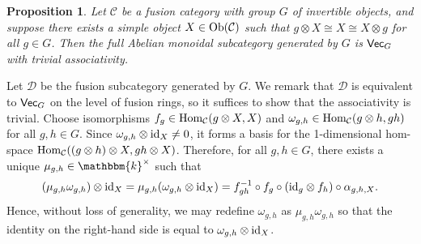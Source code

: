 \documentclass[12pt, reqno]{amsart}
\numberwithin{equation}{section}
\theoremstyle{plainspace}
\newtheorem{proposition}[theorem]{Proposition}
\theoremstyle{definitionspace}
\theoremstyle{remarkspace}
\renewenvironment{proof}{{\noindent\textbf{Proof.}}}{\null\hfill\qedsymbol}
\newcommand{\id}{\textup{id}}
\newcommand{\mathcat}[1]{\mathcal{#1}}
\newcommand{\Ob}{\textup{Ob}}
\newcommand{\Hom}[2][]{
	\ifthenelse{\equal{#2}{}}
		{\textup{Hom}_{#1}}
		{\textup{Hom}_{#1}\!\left(#2\right)}
}
\newcommand{\textcat}[1]{\textup{\textsf{#1}}}
\begin{document}
\begin{proposition}\label{prop:near-group_trivial_associativity} \cite[Remark 3.2]{Izumi_2015}
Let $\mathcat{C}$ be a fusion category with group $G$ of invertible objects, and suppose there exists a simple object $X \in \Ob(\mathcat{C})$ such that $g \otimes X \cong X \cong X \otimes g$ for all $g \in G$. Then the full Abelian monoidal subcategory generated by $G$ is $\textcat{Vec}_G$ with trivial associativity.
\end{proposition}
\leavevmode\newline
\begin{proof}
\noindent Let $\mathcat{D}$ be the fusion subcategory generated by $G$. We remark that $\mathcat{D}$ is equivalent to $\textcat{Vec}_G$ on the level of fusion rings, so it suffices to show that the associativity is trivial. Choose isomorphisms $f_g \in \Hom[\mathcat{C}]{g \otimes X, X}$ and $\omega_{g,h} \in \Hom[\mathcat{C}]{g \otimes h, gh}$ for all $g, h \in G$. Since $\omega_{g,h} \otimes \id_X \neq 0$, it forms a basis for the 1-dimensional hom-space $\Hom[\mathcat{C}]{(g \otimes h) \otimes X, gh \otimes X}$. Therefore, for all $g, h \in G$, there exists a unique $\mu_{g,h} \in \mathbbm{k}^{\times}$ such that
\begin{align*}
\begin{split}
(\mu_{g,h}\omega_{g,h}) \otimes \id_X = \mu_{g,h}(\omega_{g,h} \otimes \id_X) = f_{gh}^{-1} \circ f_g \circ (\id_g \otimes f_h) \circ \alpha_{g,h,X}.
\end{split}
\end{align*}
\noindent Hence, without loss of generality, we may redefine $\omega_{g,h}$ as $\mu_{g,h}\omega_{g,h}$ so that the identity on the right-hand side is equal to $\omega_{g,h} \otimes \id_X$.
\newline


\end{proof}
\end{document}
